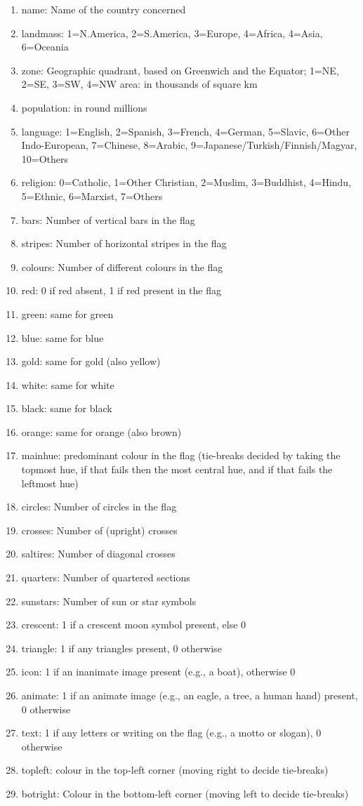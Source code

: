 \begin{enumerate}
\item name:	Name of the country concerned
\item landmass:	1=N.America, 2=S.America, 3=Europe, 4=Africa, 4=Asia, 6=Oceania
\item zone:	Geographic quadrant, based on Greenwich and the Equator; 1=NE, 2=SE, 3=SW, 4=NW area:	in thousands of square km
\item population:	in round millions
\item language: 1=English, 2=Spanish, 3=French, 4=German, 5=Slavic, 6=Other Indo-European, 7=Chinese, 8=Arabic, 9=Japanese/Turkish/Finnish/Magyar, 10=Others
\item religion: 0=Catholic, 1=Other Christian, 2=Muslim, 3=Buddhist, 4=Hindu, 5=Ethnic, 6=Marxist, 7=Others
\item bars:     Number of vertical bars in the flag
\item stripes:  Number of horizontal stripes in the flag
\item colours:  Number of different colours in the flag
\item red:      0 if red absent, 1 if red present in the flag
\item green:    same for green
\item blue:     same for blue
\item gold:     same for gold (also yellow)
\item white:    same for white
\item black:    same for black
\item orange:   same for orange (also brown)
\item mainhue:  predominant colour in the flag (tie-breaks decided by taking the topmost hue, if that fails then the most central hue, and if that fails the leftmost hue)
\item circles:  Number of circles in the flag
\item crosses:  Number of (upright) crosses
\item saltires: Number of diagonal crosses
\item quarters: Number of quartered sections
\item sunstars: Number of sun or star symbols
\item crescent: 1 if a crescent moon symbol present, else 0
\item triangle: 1 if any triangles present, 0 otherwise
\item icon:     1 if an inanimate image present (e.g., a boat), otherwise 0
\item animate:  1 if an animate image (e.g., an eagle, a tree, a human hand) present, 0 otherwise
\item text:     1 if any letters or writing on the flag (e.g., a motto or slogan), 0 otherwise
\item topleft:  colour in the top-left corner (moving right to decide tie-breaks)
\item botright: Colour in the bottom-left corner (moving left to decide tie-breaks)
\end{enumerate}


